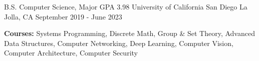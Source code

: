 
\begin{cventries}
  \cventry
    {B.S. Computer Science, Major GPA 3.98}
    {University of California San Diego}
    {La Jolla, CA}
    {September 2019 - June 2023}
    {
      \begin{cvitems}
        \item {\textbf{Courses:} Systems Programming, Discrete Math, Group \& Set Theory, Advanced Data Structures, Computer Networking, Deep Learning, Computer Vision, Computer Architecture, Computer Security}
      \end{cvitems}
    }
\end{cventries}
